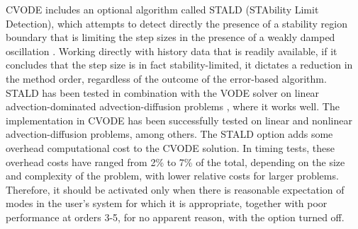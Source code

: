 CVODE includes an optional algorithm called STALD (STAbility Limit
Detection), which attempts to detect directly the presence of a
stability region boundary that is limiting the step sizes in the
presence of a weakly damped oscillation \cite{Hin:92}.  Working
directly with history data that is readily available, if it concludes
that the step size is in fact stability-limited, it dictates a
reduction in the method order, regardless of the outcome of the
error-based algorithm.  STALD has been tested in combination with the
VODE solver on linear advection-dominated advection-diffusion problems
\cite{Hin:95}, where it works well.  The implementation in CVODE has
been successfully tested on linear and nonlinear advection-diffusion
problems, among others.
The STALD option adds some overhead computational cost to the CVODE
solution.  In timing tests, these overhead costs have ranged from 2\%
to 7\% of the total, depending on the size and complexity of the
problem, with lower relative costs for larger problems.  Therefore, it
should be activated only when there is reasonable expectation of modes
in the user's system for which it is appropriate, together with poor
performance at orders 3-5, for no apparent reason, with the option
turned off.
